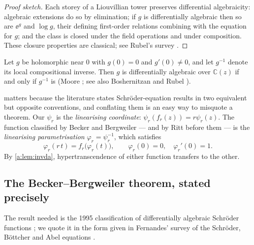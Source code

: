 \begin{proof}[Proof sketch]
Each storey of a Liouvillian tower preserves differential algebraicity: algebraic
extensions do so by elimination; if $g$ is differentially algebraic then so are
$\ee^{g}$ and $\log g$, their defining first-order relations combining with the
equation for $g$; and the class is closed under the field operations and under
composition. These closure properties are classical; see Rubel's survey
\cite{Rubel1989}.
\end{proof}

\begin{lemma}
\label{a:lem:invda}
Let $g$ be holomorphic near $0$ with $g(0)=0$ and $g'(0)\neq0$, and let $g^{-1}$
denote its local compositional inverse. Then $g$ is differentially algebraic over
$\mathbb C(z)$ if and only if $g^{-1}$ is (Moore \cite{Moore1896}; see also
Boshernitzan and Rubel \cite{BoshernitzanRubel1986}).
\end{lemma}

 matters because the literature states Schröder-equation results
in two equivalent but opposite conventions, and conflating them is an easy way to
misquote a theorem. Our $\psi_r$ is the \emph{linearising coordinate}:
$\psi_r(f_r(z)) = r\psi_r(z)$. The function classified by Becker and Bergweiler ---
and by Ritt before them --- is the \emph{linearising parametrisation}
$\varphi_r = \psi_r^{-1}$, which satisfies
\begin{equation}
\label{a:eq:schroderparam}
\varphi_r(r\,t) = f_r\bigl(\varphi_r(t)\bigr),
\qquad
\varphi_r(0)=0,\quad\varphi_r'(0)=1 .
\end{equation}
By \cref{a:lem:invda}, hypertranscendence of either function transfers to the other.

\subsection{The Becker--Bergweiler theorem, stated precisely}
\label{a:sec:BB}

The result needed is the 1995 classification of differentially algebraic Schröder
functions \cite{Becker1995}; we quote it in the form given in Fernandes' survey of
the Schröder, Böttcher and Abel equations \cite[Thm~3.1]{Fernandes2021}.

